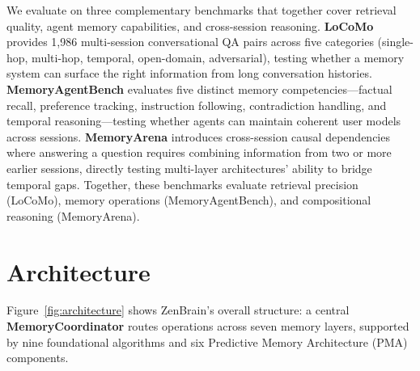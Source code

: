 \documentclass{article}
\begin{document}
We evaluate on three complementary benchmarks that together cover
retrieval quality, agent memory capabilities, and cross-session reasoning.
\textbf{LoCoMo} \citep{maharana2024locomo} provides 1{,}986 multi-session
conversational QA pairs across five categories (single-hop, multi-hop,
temporal, open-domain, adversarial), testing whether a memory system
can surface the right information from long conversation histories.
\textbf{MemoryAgentBench} \citep{he2025memoryagentbench} evaluates five
distinct memory competencies---factual recall, preference tracking,
instruction following, contradiction handling, and temporal reasoning---testing
whether agents can maintain coherent user models across sessions.
\textbf{MemoryArena} \citep{he2026memoryarena} introduces cross-session
causal dependencies where answering a question requires combining
information from two or more earlier sessions, directly testing
multi-layer architectures' ability to bridge temporal gaps.
Together, these benchmarks evaluate retrieval precision (LoCoMo),
memory operations (MemoryAgentBench), and compositional reasoning
(MemoryArena).

\section{Architecture}
\label{sec:architecture}

Figure~\ref{fig:architecture} shows ZenBrain's overall structure: a central
\textbf{MemoryCoordinator} routes operations across seven memory layers,
supported by nine foundational algorithms and six Predictive Memory
Architecture (PMA) components.
\end{document}

